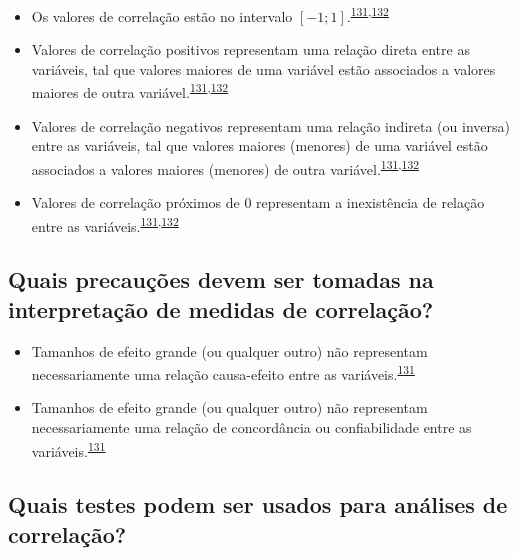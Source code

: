 \documentclass[
  a4paper,
]{book}
\begin{document}
\begin{itemize}
\item
  Os valores de correlação estão no intervalo \([-1; 1]\).\textsuperscript{\protect\hyperlink{ref-khamis2008}{131},\protect\hyperlink{ref-allison2022}{132}}
\item
  Valores de correlação positivos representam uma relação direta entre as variáveis, tal que valores maiores de uma variável estão associados a valores maiores de outra variável.\textsuperscript{\protect\hyperlink{ref-khamis2008}{131},\protect\hyperlink{ref-allison2022}{132}}
\item
  Valores de correlação negativos representam uma relação indireta (ou inversa) entre as variáveis, tal que valores maiores (menores) de uma variável estão associados a valores maiores (menores) de outra variável.\textsuperscript{\protect\hyperlink{ref-khamis2008}{131},\protect\hyperlink{ref-allison2022}{132}}
\item
  Valores de correlação próximos de \(0\) representam a inexistência de relação entre as variáveis.\textsuperscript{\protect\hyperlink{ref-khamis2008}{131},\protect\hyperlink{ref-allison2022}{132}}
\end{itemize}

\hypertarget{quais-precauuxe7uxf5es-devem-ser-tomadas-na-interpretauxe7uxe3o-de-medidas-de-correlauxe7uxe3o}{%
\subsection{Quais precauções devem ser tomadas na interpretação de medidas de correlação?}\label{quais-precauuxe7uxf5es-devem-ser-tomadas-na-interpretauxe7uxe3o-de-medidas-de-correlauxe7uxe3o}}

\begin{itemize}
\item
  Tamanhos de efeito grande (ou qualquer outro) não representam necessariamente uma relação causa-efeito entre as variáveis.\textsuperscript{\protect\hyperlink{ref-khamis2008}{131}}
\item
  Tamanhos de efeito grande (ou qualquer outro) não representam necessariamente uma relação de concordância ou confiabilidade entre as variáveis.\textsuperscript{\protect\hyperlink{ref-khamis2008}{131}}
\end{itemize}

\hypertarget{quais-testes-podem-ser-usados-para-anuxe1lises-de-correlauxe7uxe3o}{%
\subsection{Quais testes podem ser usados para análises de correlação?}\label{quais-testes-podem-ser-usados-para-anuxe1lises-de-correlauxe7uxe3o}}
\end{document}
